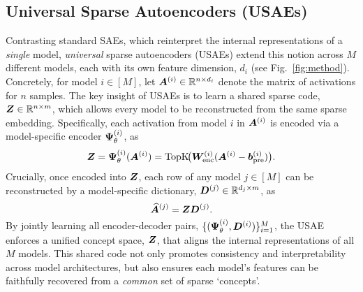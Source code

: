 \vspace{-2mm}
\subsection{Universal Sparse Autoencoders (USAEs)}
\vspace{-1mm}
Contrasting standard SAEs, which reinterpret the internal representations of a \emph{single} model, \emph{universal} sparse autoencoders (USAEs) extend this notion across $M$ different models, each with its own feature dimension, $d_i$ (see Fig.~\ref{fig:method}).  Concretely, for model $i \in [M]$, let $\bm{A}^{(i)} \in \mathbb{R}^{n \times d_i}$ denote the matrix of activations for $n$ samples.  The key insight of USAEs is to learn a shared sparse code, $\bm{Z} \in \mathbb{R}^{n \times m}$, which allows every model to be reconstructed from the same sparse embedding. Specifically, each activation from model $i$ in $\bm{A}^{(i)}$ is encoded via a model-specific encoder $\bm{\Psi}_{\theta}^{(i)}$, as
\begin{equation}
    \bm{Z} = \bm{\Psi}_{\theta}^{(i)}(\bm{A}^{(i)}) = \text{TopK}\!\bigl(\bm{W}_{\text{enc}}^{(i)}(\bm{A}^{(i)} - \bm{b}^{(i)}_{\text{pre}})\bigr).
\end{equation}
 Crucially, once encoded into $\bm{Z}$, each row of any model $j \in [M]$ can be reconstructed by a model-specific dictionary, $\bm{D}^{(j)} \in \mathbb{R}^{d_j \times m}$, as
\begin{equation}
    \widehat{\bm{A}}^{(j)} = \bm{Z} \bm{D}^{(j)}.
\end{equation}
By jointly learning all encoder-decoder pairs, $\{(\bm{\Psi}_{\theta}^{(i)}, \bm{D}^{(i)})\}_{i=1}^M$, the USAE enforces a unified concept space, $\bm{Z}$, that aligns the internal representations of all $M$ models. This shared code not only promotes consistency and interpretability across model architectures, but also ensures each model’s features can be faithfully recovered from a \emph{common} set of sparse `concepts'.


\vspace{-2mm}
